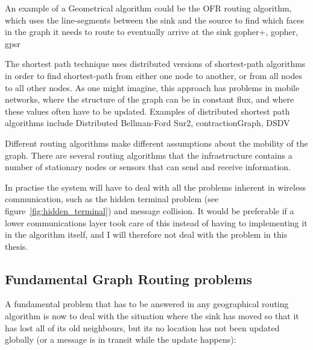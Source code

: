 \begin{description}
{An example of a Geometrical algorithm could be the OFR \cite{gopher} routing algorithm, which uses the line-segments between the sink and the source to find which faces in the graph it needs to route to eventually arrive at the sink}
{gopher+, gopher, gpsr}

      {The shortest path technique uses distributed versions of shortest-path algorithms in order to find shortest-path from either one node to another, or from all nodes to all other nodes. As one might imagine, this approach has problems in mobile networks, where the structure of the graph can be in constant flux, and where these values often have to be updated. Examples of distributed shortest path algorithms include Distributed Bellman-Ford}
{Sur2, contractionGraph, DSDV}
\end{description}

Different routing algorithms make different assumptions about the mobility of the graph. There are several routing algorithms \cite{adaptive, two-tier} that the infrastructure contains a number of stationary nodes or sensors that can send and receive information. 


In practise the system will have to deal with all the problems inherent in wireless communication, such as the hidden terminal problem (see figure~\ref{fig:hidden_terminal}) and message collision. It would be preferable if a lower communications layer took care of this instead of having to implementing it in the algorithm itself, and I will therefore not deal with the problem in this thesis.

\subsection{Fundamental Graph Routing problems}
A fundamental problem that has to be answered in any geographical routing algorithm is now to deal with the situation where the sink has moved so that it has lost all of its old neighbours, but its no location has not been updated globally (or a message is in transit while the update happens):

